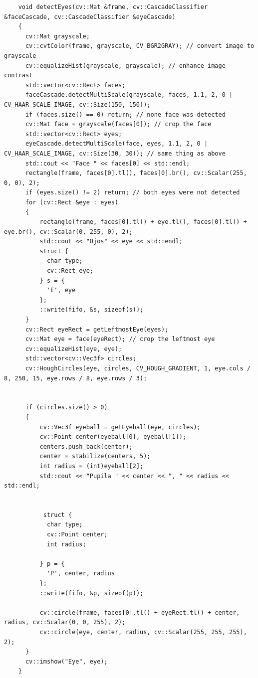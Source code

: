 \begin{itemize}
    
    \begin{verbatim}
    void detectEyes(cv::Mat &frame, cv::CascadeClassifier &faceCascade, cv::CascadeClassifier &eyeCascade)
    {
      cv::Mat grayscale;
      cv::cvtColor(frame, grayscale, CV_BGR2GRAY); // convert image to grayscale
      cv::equalizeHist(grayscale, grayscale); // enhance image contrast 
      std::vector<cv::Rect> faces;
      faceCascade.detectMultiScale(grayscale, faces, 1.1, 2, 0 | CV_HAAR_SCALE_IMAGE, cv::Size(150, 150));
      if (faces.size() == 0) return; // none face was detected
      cv::Mat face = grayscale(faces[0]); // crop the face
      std::vector<cv::Rect> eyes;
      eyeCascade.detectMultiScale(face, eyes, 1.1, 2, 0 | CV_HAAR_SCALE_IMAGE, cv::Size(30, 30)); // same thing as above    
      std::cout << "Face " << faces[0] << std::endl;
      rectangle(frame, faces[0].tl(), faces[0].br(), cv::Scalar(255, 0, 0), 2);
      if (eyes.size() != 2) return; // both eyes were not detected
      for (cv::Rect &eye : eyes)
      {	
          rectangle(frame, faces[0].tl() + eye.tl(), faces[0].tl() + eye.br(), cv::Scalar(0, 255, 0), 2);
          std::cout << "Ojos" << eye << std::endl;
          struct {
            char type;
            cv::Rect eye;
          } s = {
            'E', eye
          };
          ::write(fifo, &s, sizeof(s));
      }
      cv::Rect eyeRect = getLeftmostEye(eyes);
      cv::Mat eye = face(eyeRect); // crop the leftmost eye
      cv::equalizeHist(eye, eye);
      std::vector<cv::Vec3f> circles;
      cv::HoughCircles(eye, circles, CV_HOUGH_GRADIENT, 1, eye.cols / 8, 250, 15, eye.rows / 8, eye.rows / 3);
      
      
      if (circles.size() > 0)
      {
          cv::Vec3f eyeball = getEyeball(eye, circles);
          cv::Point center(eyeball[0], eyeball[1]);
          centers.push_back(center);
          center = stabilize(centers, 5);
          int radius = (int)eyeball[2];
          std::cout << "Pupila " << center << ", " << radius << std::endl;
          
          
           struct {
            char type;
            cv::Point center;
            int radius;
           
          } p = {
            'P', center, radius
          };
          ::write(fifo, &p, sizeof(p));
          
          cv::circle(frame, faces[0].tl() + eyeRect.tl() + center, radius, cv::Scalar(0, 0, 255), 2);
          cv::circle(eye, center, radius, cv::Scalar(255, 255, 255), 2);
      }
      cv::imshow("Eye", eye);
    }



\end{verbatim}
\end{itemize}
